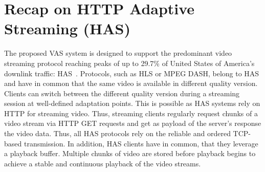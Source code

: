 \section{Recap on HTTP Adaptive Streaming (HAS)}
\label{sec:715_has}
The proposed \ac{VAS} system is designed to support the predominant video streaming protocol reaching peaks of up to 29.7\% of United States of America's downlink traffic: \acf{HAS}~\cite{Adhikari2012}.
Protocols, such as \ac{HLS} or \ac{MPEG} \ac{DASH}, belong to \ac{HAS} and have in common that the same video is available in different quality version.
Clients can switch between the different quality version during a streaming session at well-defined adaptation points.
This is possible as \ac{HAS} systems rely on \ac{HTTP} for streaming video.
Thus, streaming clients regularly request chunks of a video stream via \ac{HTTP} GET requests and get as payload of the server's response the video data.
Thus, all \ac{HAS} protocols rely on the reliable and ordered \ac{TCP}-based transmission.
In addition, \ac{HAS} clients have in common, that they leverage a playback buffer. 
Multiple chunks of video are stored before playback begins to achieve a stable and continuous playback of the video streams.

